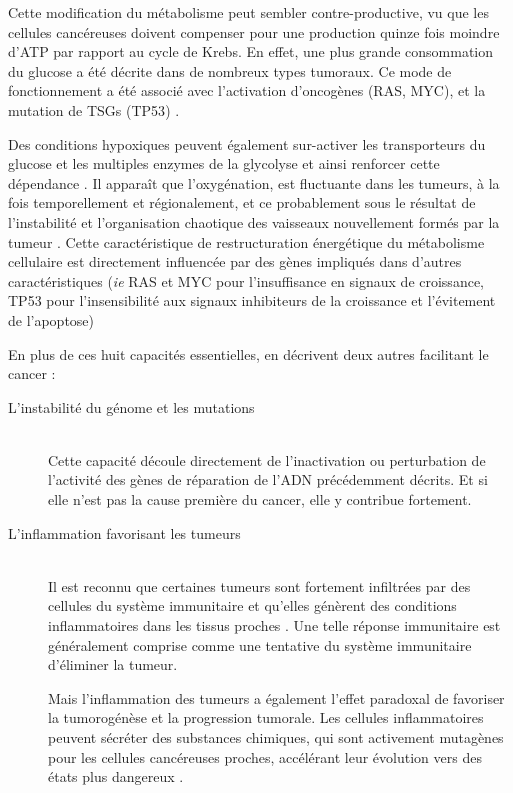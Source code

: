 \begin{description}
          Cette modification du métabolisme peut sembler contre-productive, vu que les cellules cancéreuses doivent compenser pour une production quinze fois moindre d'\acs{ATP} par rapport au cycle de Krebs.
          En effet, une plus grande consommation du glucose a été décrite dans de nombreux types tumoraux.
          Ce mode de fonctionnement a été associé avec l'activation d'oncogènes (\acs{RAS}, \acs{MYC}), et la mutation de \acsp{TSG} (\acs{TP53}) \citep{Deberardinis2008}.

          Des conditions hypoxiques peuvent également sur-activer les transporteurs du glucose et les multiples enzymes de la glycolyse et ainsi renforcer cette dépendance \citep{Deberardinis2008}.
          Il apparaît que l'oxygénation, est fluctuante dans les tumeurs, à la fois temporellement et régionalement, et ce probablement sous le résultat de l'instabilité et l'organisation chaotique des vaisseaux nouvellement formés par la tumeur \citep{Hardee2009}.
          Cette caractéristique de restructuration énergétique du métabolisme cellulaire est directement influencée par des gènes impliqués dans d'autres caractéristiques (\emph{ie} \acs{RAS} et \acs{MYC} pour l'insuffisance en signaux de croissance, \acs{TP53} pour l'insensibilité aux signaux inhibiteurs de la croissance et l'évitement de l'apoptose)
      \end{description}
      \vspace{1.5ex}

      En plus de ces huit capacités essentielles, \citeauthor{Hanahan2011} en décrivent deux autres facilitant le cancer :
      \begin{description}
        \item [L'instabilité du génome et les mutations]    \hfill \\
          Cette capacité découle directement de l'inactivation ou perturbation de l'activité des gènes de réparation de l'\acs{ADN} précédemment décrits.
          Et si elle n'est pas la cause première du cancer, elle y contribue fortement.

        \item [L'inflammation favorisant les tumeurs]       \hfill \\
          Il est reconnu que certaines tumeurs sont fortement infiltrées par des cellules du système immunitaire et qu'elles génèrent des conditions inflammatoires dans les tissus proches \citep{Dvorak1986}.
          Une telle réponse immunitaire est généralement comprise comme une tentative du système immunitaire d'éliminer la tumeur.

          Mais l'inflammation des tumeurs a également l'effet paradoxal de favoriser la tumorogénèse et la progression tumorale.
          Les cellules inflammatoires peuvent sécréter des substances chimiques, qui sont activement mutagènes pour les cellules cancéreuses proches, accélérant leur évolution vers des états plus dangereux \citep{Grivennikov2010}.
      \end{description}
      \vspace{1.5ex}


